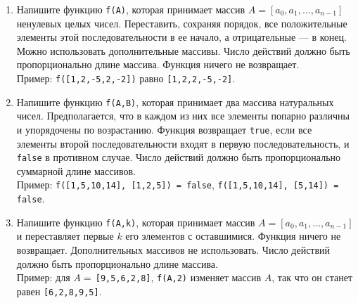 \documentclass{article}
\begin{document}
\begin{enumerate}[label={}, leftmargin=0pt, itemindent=0pt]
\begin{enumerate}[label=\arabic{enumi}.\arabic*.]
\item 
Напишите функцию \texttt{f(A)}, которая принимает массив $A = [a_0, a_1, \ldots, a_{n-1}]$ ненулевых целых чисел. Переставить, сохраняя порядок, все положительные элементы этой последовательности в ее начало, а отрицательные --- в конец. Можно использовать дополнительные массивы. Число действий должно быть пропорционально длине массива. Функция ничего не возвращает. 
\\Пример: \texttt{f([1,2,-5,2,-2])} равно \texttt{[1,2,2,-5,-2]}.

\item 
Напишите функцию \texttt{f(A,B)}, которая принимает два массива натуральных чисел. Предполагается, что в каждом из них все элементы попарно различны и упорядочены по возрастанию. Функция возвращает \texttt{true}, если все элементы второй последовательности входят в первую последовательность, и \texttt{false} в противном случае. Число действий должно быть пропорционально суммарной длине массивов.
\\Пример: \texttt{f([1,5,10,14], [1,2,5]) = false}, \newline \texttt{f([1,5,10,14], [5,14]) = false}.

\item 
Напишите функцию \texttt{f(A,k)}, которая принимает массив $A = [a_0, a_1, \ldots, a_{n-1}]$ и переставляет первые $k$ его элементов с оставшимися. Функция ничего не возвращает. Дополнительных массивов не использовать. Число действий должно быть пропорционально длине массива.
\\Пример: для $A=$\,\texttt{[9,5,6,2,8]}, \texttt{f(A,2)} изменяет массив $A$, так что он станет равен \texttt{[6,2,8,9,5]}.
\end{enumerate}

\end{enumerate}
\end{document}
